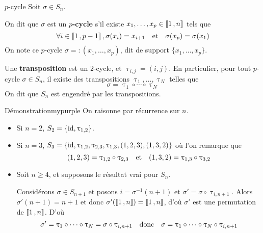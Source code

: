     \begin{defitheo}{$p$-cycle}{}
        Soit $\sigma \in S_n$.

        On dit que $\sigma$ est un \textbf{$p$-cycle} s’il existe $x_1,\ldots,x_p \in \left\llbracket 1 \, , n \right\rrbracket$ tels que 
        \[ \forall i \in \left\llbracket 1 \, , p-1 \right\rrbracket, \sigma(x_i) = x_{i + 1} \quad \text{et} \quad \sigma(x_p) = \sigma(x_1) \]
        On note ce $p$-cycle $\sigma =: (x_1,\ldots,x_p)$, dit de support $\{ x_1,\ldots, x_p \}$.

        Une \textbf{transposition} est un $2$-cycle, et $\uptau_{i,j} = (i,j)$. En particulier, pour tout $p$-cycle $\sigma \in S_n$, il existe des transpositions $\uptau_1,\ldots,\uptau_N$ telles que 
        \[ \sigma = \uptau_1 \circ \cdots \circ \uptau_N \]   
        On dit que $S_n$ est engendré par les transpositions.
    \end{defitheo}

    \begin{demo}{Démonstration}{mypurple}
        On raisonne par récurrence sur $n$.
        \begin{itemize}
            \item Si $n = 2$, $S_2 = \{ \operatorname{id}, \uptau_{1,2} \}$.
            \item Si $n = 3$, $S_3 = \{ \operatorname{id}, \uptau_{1,2}, \uptau_{2,3}, \uptau_{1,3}, (1,2,3), (1,3,2) \}$ où l’on remarque que 
            \[ (1,2,3) = \uptau_{1,2} \circ \uptau_{2,3} \quad \text{et} \quad (1,3,2) = \uptau_{1,3} \circ \uptau_{3,2} \]   
            \item Soit $n \geq 4$, et supposons le résultat vrai pour $S_n$. 
            
            Considérons $\sigma \in S_{n+1}$ et posons $i = \sigma^{-1}(n+1)$ et $\sigma' = \sigma \circ \uptau_{i,n+1}$. Alors $\sigma'(n+1) = n+1$ et donc $\sigma'(\left\llbracket 1 \, , n \right\rrbracket) = \left\llbracket 1 \, , n \right\rrbracket$, d’où $\sigma'$ est une permutation de $\left\llbracket 1 \, , n \right\rrbracket$. D’où 
            \[ \sigma' = \uptau_1 \circ \cdots \circ \uptau_N = \sigma \circ \uptau_{i,n+1} \quad \text{donc} \quad \sigma = \uptau_1 \circ \cdots \circ \uptau_N \circ \uptau_{i,n+1} \]
        \end{itemize}
    \end{demo}

